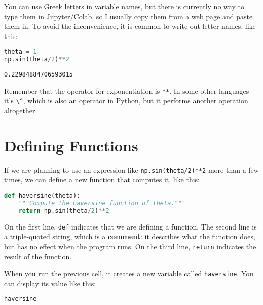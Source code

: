 You can use Greek letters in variable names, but there is currently no
way to type them in Jupyter/Colab, so I usually copy them from a web
page and paste them in. To avoid the inconvenience, it is common to
write out letter names, like this:

\begin{lstlisting}[language=Python,style=source]
theta = 1
np.sin(theta/2)**2
\end{lstlisting}

\begin{lstlisting}[style=output]
0.22984884706593015
\end{lstlisting}

Remember that the operator for exponentiation is
\passthrough{\lstinline!**!}. In some other languages it's
\passthrough{\lstinline!\^!}, which is also an operator in Python, but
it performs another operation altogether.

\section{Defining Functions}\label{defining-functions}

If we are planning to use an expression like
\passthrough{\lstinline!np.sin(theta/2)**2!} more than a few times, we
can define a new function that computes it, like this:

\begin{lstlisting}[language=Python,style=source]
def haversine(theta):
    """Compute the haversine function of theta."""
    return np.sin(theta/2)**2
\end{lstlisting}

On the first line, \passthrough{\lstinline!def!} indicates that we are
defining a function. The second line is a triple-quoted string, which is
a \textbf{comment}: it describes what the function does, but has no
effect when the program runs. On the third line,
\passthrough{\lstinline!return!} indicates the result of the function.

When you run the previous cell, it creates a new variable called
\passthrough{\lstinline!haversine!}. You can display its value like
this:

\begin{lstlisting}[language=Python,style=source]
haversine
\end{lstlisting}

